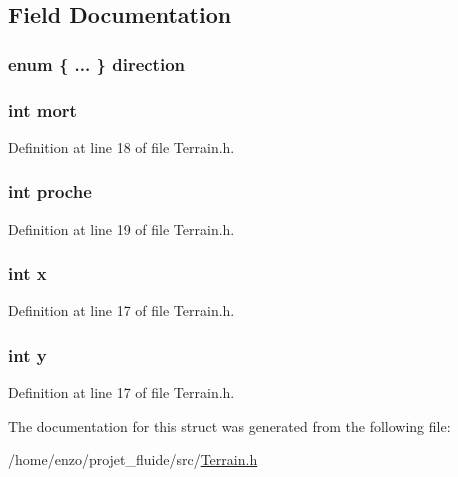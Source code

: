 \subsection{Field Documentation}
\hypertarget{struct_fantome_a3b781c6f2ff99911d58614aedbf40c2a}{
\subsubsection[{direction}]{\setlength{\rightskip}{0pt plus 5cm}enum \{ ... \}   direction}}\label{struct_fantome_a3b781c6f2ff99911d58614aedbf40c2a}
\hypertarget{struct_fantome_a80e06e27760b1b0623a2aac7dc1bc191}{
\subsubsection[{mort}]{\setlength{\rightskip}{0pt plus 5cm}int mort}}\label{struct_fantome_a80e06e27760b1b0623a2aac7dc1bc191}


Definition at line 18 of file Terrain.\-h.

\hypertarget{struct_fantome_ae8ffd4287a5e2d2b9c8a268be76a8b89}{
\subsubsection[{proche}]{\setlength{\rightskip}{0pt plus 5cm}int proche}}\label{struct_fantome_ae8ffd4287a5e2d2b9c8a268be76a8b89}


Definition at line 19 of file Terrain.\-h.

\hypertarget{struct_fantome_a6150e0515f7202e2fb518f7206ed97dc}{
\subsubsection[{x}]{\setlength{\rightskip}{0pt plus 5cm}int x}}\label{struct_fantome_a6150e0515f7202e2fb518f7206ed97dc}


Definition at line 17 of file Terrain.\-h.

\hypertarget{struct_fantome_a0a2f84ed7838f07779ae24c5a9086d33}{
\subsubsection[{y}]{\setlength{\rightskip}{0pt plus 5cm}int y}}\label{struct_fantome_a0a2f84ed7838f07779ae24c5a9086d33}


Definition at line 17 of file Terrain.\-h.



The documentation for this struct was generated from the following file\-:\begin{DoxyCompactItemize}
\item 
/home/enzo/projet\-\_\-fluide/src/\hyperlink{_terrain_8h}{Terrain.\-h}\end{DoxyCompactItemize}

